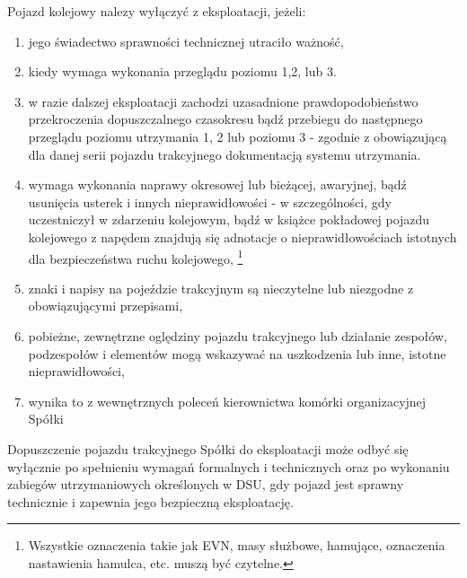Pojazd kolejowy nalezy wyłączyć z eksploatacji, jeżeli:
\begin{enumerate}
	\item jego świadectwo sprawności technicznej utraciło ważność,
	\item kiedy wymaga wykonania przeglądu poziomu 1,2, lub 3.
	\item w razie dalszej eksploatacji zachodzi uzasadnione prawdopodobieństwo
	przekroczenia dopuszczalnego czasokresu bądź przebiegu do następnego
	przeglądu poziomu utrzymania 1, 2 lub poziomu 3 - zgodnie z obowiązującą
	dla danej serii pojazdu trakcyjnego dokumentacją systemu utrzymania.
	\item wymaga wykonania naprawy okresowej lub bieżącej, awaryjnej, bądź usunięcia
	usterek i innych nieprawidłowości - w szczególności, gdy uczestniczył w zdarzeniu kolejowym, bądź w książce pokładowej pojazdu kolejowego z napędem znajdują się adnotacje o nieprawidłowościach istotnych dla bezpieczeństwa ruchu kolejowego,
	\footnote{Wszystkie oznaczenia takie jak EVN, masy służbowe, hamujące, oznaczenia nastawienia hamulca, etc. muszą być czytelne.}
	\item znaki i napisy na pojeździe trakcyjnym są nieczytelne lub niezgodne z obowiązującymi przepisami,
	\item pobieżne, zewnętrzne oględziny pojazdu trakcyjnego lub działanie zespołów, podzespołów i elementów mogą wskazywać na uszkodzenia lub inne, istotne nieprawidłowości,
	\item wynika to z wewnętrznych poleceń kierownictwa komórki organizacyjnej Spółki
\end{enumerate}

Dopuszczenie pojazdu trakcyjnego Spółki do eksploatacji może odbyć się wyłącznie po spełnieniu wymagań formalnych i technicznych oraz po wykonaniu zabiegów utrzymaniowych określonych w DSU, gdy pojazd jest sprawny technicznie i zapewnia jego bezpieczną eksploatację.

